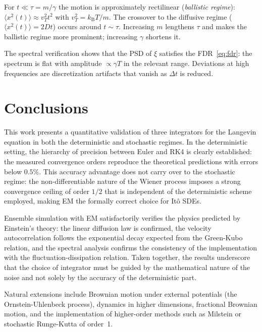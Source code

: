 \documentclass[aps,prl,twocolumn,showpacs,superscriptaddress,longbibliography]{revtex4-2}
\newcommand{\kB}{k_{\mathrm{B}}}
\newcommand{\MSD}{\langle x^2(t) \rangle}
\newcommand{\dt}{\Delta t}
\begin{document}
For $t\ll\tau=m/\gamma$ the motion is approximately rectilinear
(\textit{ballistic regime}): $\MSD\approx v_T^2 t^2$ with
$v_T^2=\kB T/m$.  The crossover to the diffusive regime ($\MSD=2Dt$)
occurs around $t\sim\tau$.  Increasing $m$ lengthens $\tau$ and makes
the ballistic regime more prominent; increasing $\gamma$ shortens it.

The spectral verification shows that the PSD of $\xi$ satisfies the
FDR~\eqref{eq:fdr}: the spectrum is flat with amplitude
$\propto\gamma T$ in the relevant range.  Deviations at high
frequencies are discretization artifacts that vanish as $\dt$ is
reduced.

\section{Conclusions}
\label{sec:conclusiones}

This work presents a quantitative validation of three integrators for
the Langevin equation in both the deterministic and stochastic regimes.
In the deterministic setting, the hierarchy of precision between Euler
and RK4 is clearly established: the measured convergence orders
reproduce the theoretical predictions with errors below $0.5\%$.
This accuracy advantage does not carry over to the stochastic regime:
the non-differentiable nature of the Wiener process imposes a strong
convergence ceiling of order $1/2$ that is independent of the
deterministic scheme employed, making EM the formally correct choice
for Itô SDEs.

Ensemble simulation with EM satisfactorily verifies the physics
predicted by Einstein's theory: the linear diffusion law is confirmed,
the velocity autocorrelation follows the exponential decay expected
from the Green-Kubo relation, and the spectral analysis confirms the
consistency of the implementation with the fluctuation-dissipation
relation.  Taken together, the results underscore that the choice of
integrator must be guided by the mathematical nature of the noise and
not solely by the accuracy of the deterministic part.

Natural extensions include Brownian motion under external potentials
(the Ornstein-Uhlenbeck process), dynamics in higher dimensions,
fractional Brownian motion, and the implementation of higher-order
methods such as Milstein or stochastic Runge-Kutta of order~1.




\end{document}
